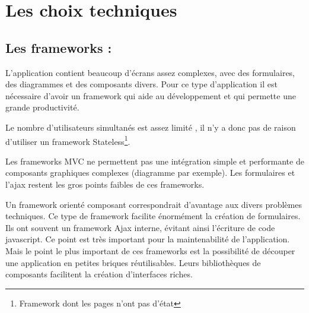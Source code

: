 \newpage{}
\chapter{Les choix techniques}


\section{Les frameworks :}

L'application contient beaucoup d'écrans assez complexes, avec des formulaires,
des diagrammes et des composants divers. Pour ce type d'application il est nécessaire
d'avoir un framework qui aide au développement et qui permette une grande productivité.

Le nombre d'utilisateurs simultanés est assez limité , il n'y a donc pas de raison
d'utiliser un framework Stateless\footnote{Framework dont les pages n'ont pas d’état}.

Les frameworks MVC ne permettent pas une intégration simple et performante de composants
graphiques complexes (diagramme par exemple). Les formulaires et l'ajax restent les gros points
faibles de ces frameworks.

Un framework orienté composant correspondrait d'avantage aux divers problèmes techniques. 
Ce type de framework facilite énormément la création de formulaires. Ils ont souvent un 
framework Ajax interne, évitant ainsi l'écriture de code javascript. Ce point est très important
pour la maintenabilité de l'application. Mais le point le plus important de ces frameworks est
la possibilité de découper une application en petites briques réutilisables. Leurs bibliothèques
de composants facilitent la création d'interfaces riches.



